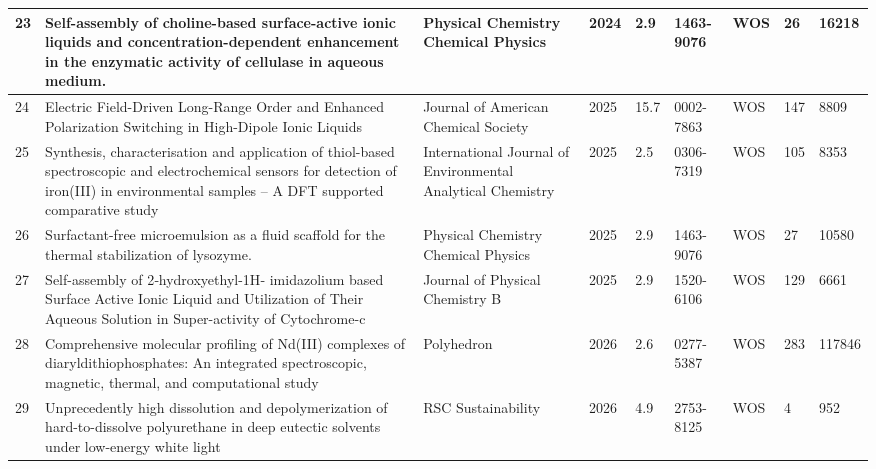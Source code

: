 \documentclass{article}
\begin{document}
\begin{landscape}
\begin{longtable}{|C{1cm}|L{8cm}|C{3cm}|C{1cm}|C{1.5cm}|C{1.6cm}|C{1.5cm}|C{1.5cm}|C{1.5cm}|}
23 & Self-assembly of choline-based surface-active ionic liquids and concentration-dependent enhancement in the enzymatic activity of cellulase in aqueous medium. & Physical Chemistry Chemical Physics & 2024 & 2.9 & 1463-9076 & WOS & 26 & 16218 \\
\hline

24 & Electric Field-Driven Long-Range Order and Enhanced Polarization Switching in High-Dipole Ionic Liquids & Journal of American Chemical Society & 2025 & 15.7 & 0002-7863 & WOS & 147 & 8809 \\
\hline

25 & Synthesis, characterisation and application of thiol-based spectroscopic and electrochemical sensors for detection of iron(III) in environmental samples – A DFT supported comparative study & International Journal of Environmental Analytical Chemistry & 2025 & 2.5 & 0306-7319 & WOS & 105 & 8353 \\
\hline

26 & Surfactant-free microemulsion as a fluid scaffold for the thermal stabilization of lysozyme. & Physical Chemistry Chemical Physics & 2025 & 2.9 & 1463-9076 & WOS & 27 & 10580 \\
\hline

27 & Self-assembly of 2‐hydroxyethyl-1H‐ imidazolium based Surface Active Ionic Liquid and Utilization of Their Aqueous Solution in Super-activity of Cytochrome-c & Journal of Physical Chemistry B & 2025 & 2.9 & 1520-6106 & WOS & 129 & 6661 \\
\hline

28 & Comprehensive molecular profiling of Nd(III) complexes of diaryldithiophosphates: An integrated spectroscopic, magnetic, thermal, and computational study & Polyhedron & 2026 &  2.6 & 0277-5387 & WOS & 283 & 117846 \\
\hline

29 & Unprecedently high dissolution and depolymerization of hard-to-dissolve polyurethane
in deep eutectic solvents under low-energy white light & RSC Sustainability & 2026 & 4.9 & 2753-8125 & WOS & 4 & 952 \\
\hline


\end{longtable}

\end{landscape}
\end{document}
